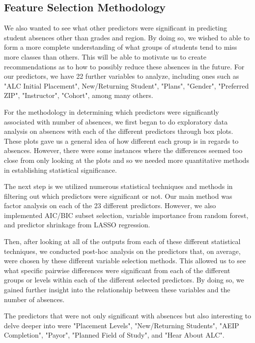\documentclass[12pt,letterpaper]{article}
\begin{document}
\subsection{Feature Selection Methodology}

We also wanted to see what other predictors were significant in predicting student absences other than grades and region. By doing so, we wished to able to form a more complete understanding of what groups of students tend to miss more classes than others. This will be able to motivate us to create recommendations as to how to possibly reduce these absences in the future. For our predictors, we have 22 further variables to analyze, including ones such as "ALC Initial Placement", New/Returning Student", "Plans", "Gender", "Preferred ZIP", "Instructor", "Cohort", among many others. 

For the methodology in determining which predictors were significantly associated with number of absences, we first began to do exploratory data analysis on absences with each of the different predictors through box plots. These plots gave us a general idea of how different each group is in regards to absences. However, there were some instances where the differences seemed too close from only looking at the plots and so we needed more quantitative methods in establishing statistical significance.

The next step is we utilized numerous statistical techniques and methods in filtering out which predictors were significant or not. Our main method was factor analysis on each of the 23 different predictors. However, we also implemented AIC/BIC subset selection, variable importance from random forest, and predictor shrinkage from LASSO regression. 

Then, after looking at all of the outputs from each of these different statistical techniques, we conducted post-hoc analysis on the predictors that, on average, were chosen by these different variable selection methods. This allowed us to see what specific pairwise differences were significant from each of the different groups or levels within each of the different selected predictors. By doing so, we gained further insight into the relationship between these variables and the number of absences.

The predictors that were not only significant with absences but also interesting to delve deeper into were "Placement Levels", "New/Returning Students", "AEIP Completion", "Payor", "Planned Field of Study", and "Hear About ALC".
\end{document}
